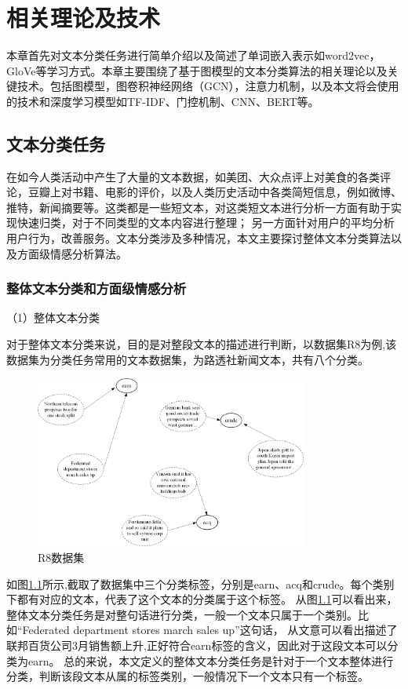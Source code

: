 \chapter{相关理论及技术}
本章首先对文本分类任务进行简单介绍以及简述了单词嵌入表示如word2vec，GloVe等学习方式。本章主要围绕了基于图模型的文本分类算法的相关理论以及关键技术。包括图模型，图卷积神经网络（GCN），注意力机制，以及本文将会使用的技术和深度学习模型如TF-IDF、门控机制、CNN、BERT等。
\section{文本分类任务}
在如今人类活动中产生了大量的文本数据，如美团、大众点评上对美食的各类评论，豆瓣上对书籍、电影的评价，以及人类历史活动中各类简短信息，例如微博、推特，新闻摘要等。这类都是一些短文本，对这类短文本进行分析一方面有助于实现快速归类，对于不同类型的文本内容进行整理；
另一方面针对用户的平均分析用户行为，改善服务。文本分类涉及多种情况，本文主要探讨整体文本分类算法以及方面级情感分析算法。
\subsection{整体文本分类和方面级情感分析}
（1）整体文本分类

对于整体文本分类来说，目的是对整段文本的描述进行判断，以数据集R8为例,该数据集为分类任务常用的文本数据集，为路透社新闻文本，共有八个分类。

\begin{figure}[htb]%
	\setlength{\belowcaptionskip}{0pt}
	\centering
	\includegraphics[width=0.8\textwidth]{pic/2-1.png}
	\caption{R8数据集}
	\label{R8datasets}
\end{figure}
如图\ref{R8datasets}所示,截取了数据集中三个分类标签，分别是earn、acq和crude。每个类别下都有对应的文本，代表了这个文本的分类属于这个标签。
从图\ref{R8datasets}可以看出来，整体文本分类任务是对整句话进行分类，一般一个文本只属于一个类别。比如“Federated department stores march sales up”这句话，
从文意可以看出描述了联邦百货公司3月销售额上升,正好符合earn标签的含义，因此对于这段文本可以分类为earn。
总的来说，本文定义的整体文本分类任务是针对于一个文本整体进行分类，判断该段文本从属的标签类别，一般情况下一个文本只有一个标签。

